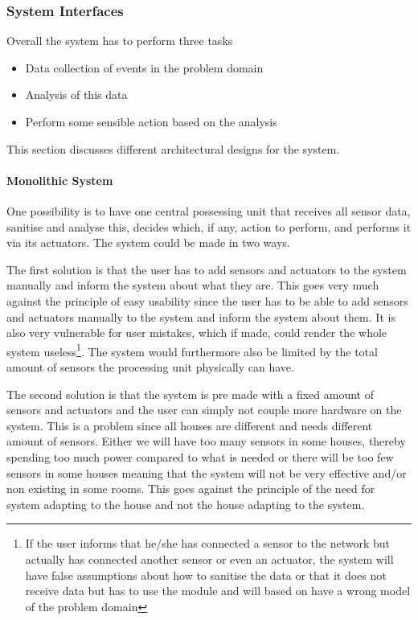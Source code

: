 \subsubsection{System Interfaces}

Overall the system has to perform three tasks
\begin{itemize}
\item Data collection of events in the problem domain
\item Analysis of this data
\item Perform some sensible action based on the analysis
\end{itemize}
This section discusses different architectural designs
for the system.

\paragraph{Monolithic System} One possibility is to have one central possessing unit that receives all sensor data, sanitise and analyse this, decides which, if any, action to perform, and performs it via its actuators. The system could be made in two ways.

The first solution is that the user has to add sensors and actuators to the system manually and inform the system about what they are. This goes very much against the principle of easy usability since the user has to be able to add sensors and actuators manually to the system and inform the system about them. It is also very vulnerable for user mistakes, which if made, could render the whole system useless\footnote{If the user informs that he/she has connected a sensor to the network but actually has connected another sensor or even an actuator, the system will have false assumptions about how to sanitise the data or that it does not receive data but has to use the module and will based on have a wrong model of the problem domain}. The system would furthermore also be limited by the total amount of sensors the processing unit physically can have.

The second solution is that the system is pre made with a fixed amount of sensors and actuators and the user can simply not couple more hardware on the system. This is a problem since all houses are different and needs different amount of sensors. Either we will have too many sensors in some houses, thereby spending too much power compared to what is needed or there will be too few sensors in some houses meaning that the system will not be very effective and/or non existing in some rooms. This goes against the principle of the need for system adapting to the house and not the house adapting to the system.

